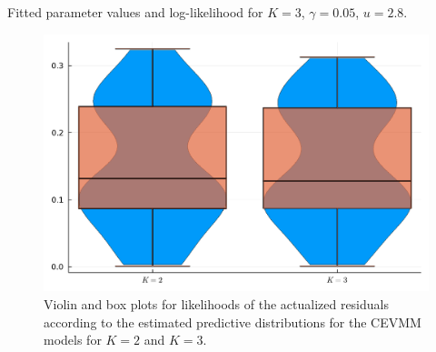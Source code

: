 \documentclass[11pt,twoside,openany]{book}
\numberwithin{Theorem}{chapter}
\numberwithin{Definition}{chapter}
\numberwithin{Lemma}{chapter}
\numberwithin{Algorithm}{chapter}
\numberwithin{equation}{chapter}
\begin{document}
\FloatBarrier

\begin{table}[htbp] \centering
  
  \caption{Fitted parameter values and log-likelihood for $K=3$, $\gamma = 0.05$, $u=2.8$.\label{table:k_3_fits}}
\end{table}



\begin{figure}[htp]
  \centering
  \includegraphics[scale=0.70]{../elexon/figures/2vs3_violin.pdf}
  \caption{Violin and box plots for likelihoods of the actualized residuals according to
  the estimated predictive distributions for the CEVMM models for $K=2$ and $K=3$.}\label{fig:k2_k3_violin}
\end{figure}
\end{document}
